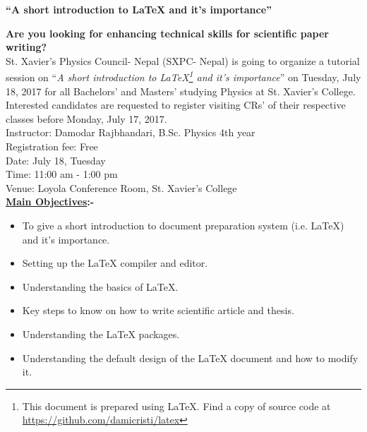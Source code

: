 \documentclass[a4paper,10pt]{article}
\begin{document}
\vspace*{2.1cm}

\begin{center}
\bfseries \LARGE \textquotedblleft A short introduction to \LaTeX \hspace{0.01cm} and it's importance\textquotedblright
\end{center}

\vspace{0.1cm}

\textbf{Are you looking for enhancing technical skills for scientific paper writing?}\\

St. Xavier's Physics Council- Nepal (SXPC- Nepal) is going to organize a tutorial session on  \textquotedblleft \textit{A short introduction to \LaTeX\footnote{This document is prepared using \LaTeX. Find a copy of source code at \url{https://github.com/damicristi/latex}} and it's importance}\textquotedblright \hspace{0.01cm} on Tuesday, July 18, 2017 for all Bachelors' and Masters' studying Physics at St. Xavier's College. Interested candidates are requested to register visiting CRs' of their respective classes before Monday, July 17, 2017. \\

Instructor: Damodar Rajbhandari, B.Sc. Physics 4th year\\
\hspace*{0.43cm} Registration fee: Free\\
\hspace*{0.43cm} Date: July 18, Tuesday\\
\hspace*{0.43cm}  Time: 11:00 am - 1:00 pm\\
\hspace*{0.43cm} Venue: Loyola Conference Room, St. Xavier's College\\


\textbf{\underline{Main Objectives}:-}
\begin{itemize}
\item To give a short introduction to document preparation system (i.e. \LaTeX) and it's importance.
\item Setting up the \LaTeX \hspace{0.01cm} compiler and editor.
\item Understanding the basics of \LaTeX.
\item Key steps to know on how to write scientific article and thesis.
\item Understanding the \LaTeX \hspace{0.01cm} packages.
\item Understanding the default design of the \LaTeX \hspace{0.01cm} document and how to modify it.  
\end{itemize}
\end{document}
